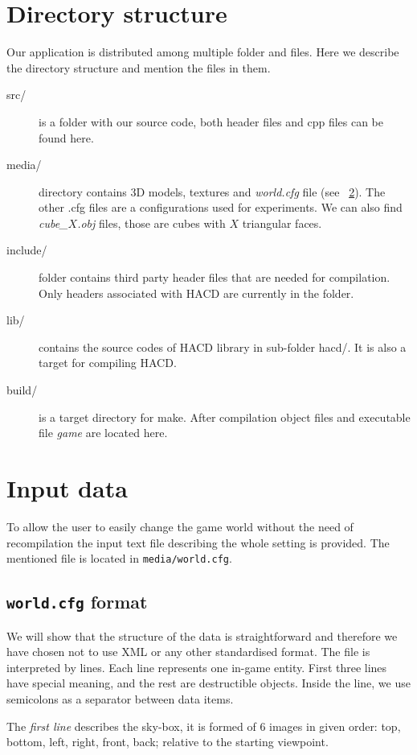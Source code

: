 \section{Directory structure}
Our application is distributed among multiple folder and files. Here we describe the directory structure and mention the files in them.
\begin{description}
\item[src/] is a folder with our source code, both header files and cpp files can be found here.
\item[media/] directory contains 3D models, textures and \emph{world.cfg}  file (see ~\cref{sec:data}). The other .cfg files are a configurations used for experiments. We can also find \emph{cube\_$X$.obj} files, those are cubes with $X$ triangular faces.
\item[include/] folder contains third party header files that are needed for compilation. Only headers associated with HACD are currently in the folder.
\item[lib/] contains the source codes of HACD library in sub-folder hacd/. It is also a target for compiling HACD.
\item[build/] is a target directory for make. After compilation object files and executable file \emph{game} are located here. 
\end{description}

\section{Input data}
\label{sec:data}
To allow the user to easily change the game world without the need of recompilation the input text file describing the whole setting is provided. The mentioned file is located in {\tt media/world.cfg}. 

\subsection*{{\tt world.cfg} format}
We will show that the structure of the data is straightforward and therefore we have chosen not to use XML or any other standardised format. The file is interpreted by lines. Each line represents one in-game entity. First three lines have special meaning, and the rest are destructible objects. Inside the line, we use semicolons as a separator between data items.

The \emph{first line} describes the sky-box, it is formed of 6 images in given order: top, bottom, left, right, front, back; relative to the starting viewpoint. 

